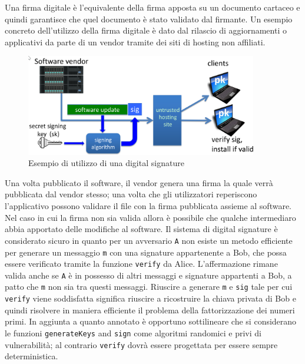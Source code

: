 Una firma digitale è l'equivalente della firma apposta su un documento cartaceo e quindi garantisce che quel documento è stato validato dal firmante. Un esempio concreto dell'utilizzo della firma digitale è dato dal rilascio di aggiornamenti o applicativi da parte di un vendor tramite dei siti di hosting non affiliati.

\begin{figure}
    \centering
    \includegraphics[width=0.9\textwidth]{images/digitalsignature.png}
    \caption{Esempio di utilizzo di una digital signature}
\end{figure}

Una volta pubblicato il software, il vendor genera una firma la quale verrà pubblicata dal vendor stesso; una volta che gli utilizzatori reperiscono l'applicativo possono validare il file con la firma pubblicata assieme al software. Nel caso in cui la firma non sia valida allora è possibile che qualche intermediaro abbia apportato delle modifiche al software.\newline\newline
Il sistema di digital signature è considerato sicuro in quanto per un avversario \texttt{A} non esiste un metodo efficiente per generare un messaggio \texttt{m} con una signature appartenente a Bob, che possa essere verificato tramite la funzione \texttt{verify} da Alice. L'affermazione rimane valida anche se \texttt{A} è in possesso di altri messaggi e signature appartenti a Bob, a patto che \texttt{m} non sia tra questi messaggi.\newline
Riuscire a generare \texttt{m} e \texttt{sig} tale per cui \texttt{verify} viene soddisfatta significa riuscire a ricostruire la chiava privata di Bob e quindi risolvere in maniera efficiente il problema della fattorizzazione dei numeri primi.\newline\newline
In aggiunta a quanto annotato è opportuno sottilineare che si considerano le funzioni \texttt{generateKeys} and \texttt{sign} come algoritmi randomici e privi di vulnerabilità; al contrario \texttt{verify} dovrà essere progettata per essere sempre deterministica.

